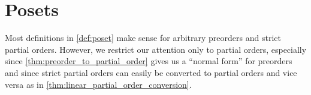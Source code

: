 \section{Posets}\label{sec:posets}

\begin{note}\label{note:only_partial_orders}
  Most definitions in \cref{def:poset} make sense for arbitrary preorders and strict partial orders. However, we restrict our attention only to partial orders, especially since \cref{thm:preorder_to_partial_order} gives us a \enquote{normal form} for preorders and since strict partial orders can easily be converted to partial orders and vice versa as in \cref{thm:linear_partial_order_conversion}.
\end{note}

